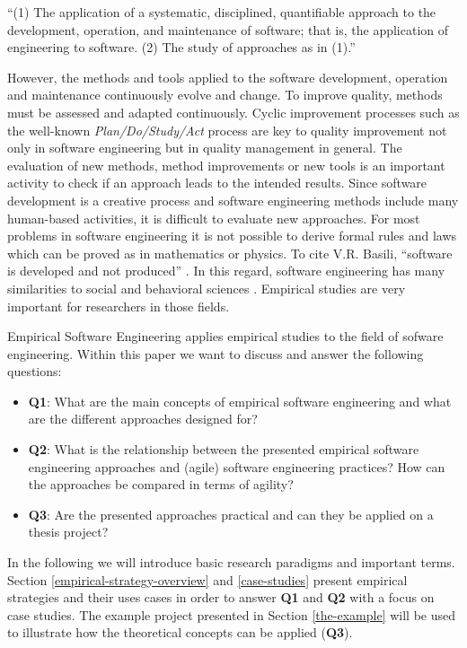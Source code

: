 \documentclass[runningheads]{llncs}
\begin{document}
\bigskip
\noindent
``(1) The application of a systematic, disciplined, quantifiable approach to the development, operation, and maintenance of software; that is, the application of engineering to software. (2) The study of approaches as in (1).''

\bigskip
\noindent
However, the methods and tools applied to the software development, operation and maintenance continuously evolve and change. To improve quality, methods must be assessed and adapted continuously. Cyclic improvement processes such as the well-known \textit{Plan/Do/Study/Act} process \cite{deming2000out} are key to quality improvement not only in software engineering but in quality management in general. The evaluation of new methods, method improvements or new tools is an important activity to check if an approach leads to the intended results. Since software development is a creative process and software engineering methods include many human-based activities, it is difficult to evaluate new approaches. For most problems in software engineering it is not possible to derive formal rules and laws which can be proved as in mathematics or physics. To cite V.R. Basili, ``software is developed and not produced'' \cite{10-1007-3-540-57092-6-91}. In this regard, software engineering has many similarities to social and behavioral sciences \cite{Wohlin:2012:ESE:2349018,robson2002real}. Empirical studies are very important for researchers in those fields. 

Empirical Software Engineering applies empirical studies to the field of sofware engineering. Within this paper we want to discuss and answer the following questions:

\begin{itemize}
	\item \textbf{Q1}: What are the main concepts of empirical software engineering and what are the different approaches designed for?
	\item \textbf{Q2}: What is the relationship between the presented empirical software engineering approaches and (agile) software engineering practices? How can the approaches be compared in terms of agility?
	\item \textbf{Q3}: Are the presented approaches practical and can they be applied on a thesis project?
\end{itemize}

In the following we will introduce basic research paradigms and important terms. Section \ref{empirical-strategy-overview} and \ref{case-studies} present empirical strategies and their uses cases in order to answer \textbf{Q1} and \textbf{Q2} with a focus on case studies. The example project presented in  Section \ref{the-example} will be used to illustrate how the theoretical concepts can be applied (\textbf{Q3}).
\end{document}
